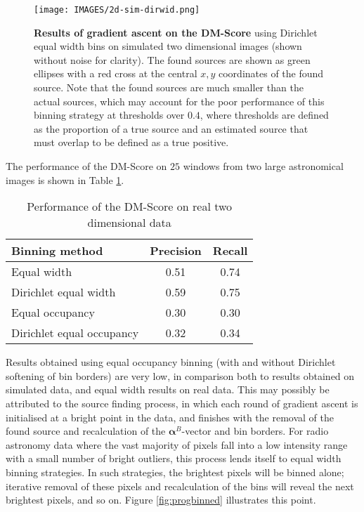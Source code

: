 \begin{figure}
\centering
\texttt{[image: IMAGES/2d-sim-dirwid.png]}
\caption[Gradient ascent on the DM-Score (2D)]{\textbf{Results of gradient ascent on the DM-Score} using Dirichlet equal width bins on simulated two dimensional images (shown without noise for clarity). The found sources are shown as green ellipses with a red cross at the central $x,y$ coordinates of the found source. Note that the found sources are much smaller than the actual sources, which may account for the poor performance of this binning strategy at thresholds over $0.4$, where thresholds are defined as the proportion of a true source and an estimated source that must overlap to be defined as a true positive. }
\label{fig:2d-sim-dirwid}
\end{figure}

The performance of the DM-Score on $25$ windows from two large astronomical images \cite{norris2006deep} is shown in Table \ref{table:2d-real-res}. 

\begin{table}
\centering
\caption[Performance of the DM-Score (real 2D)]{Performance of the DM-Score on real two dimensional data}
\begin{tabular}{l c c}
\hline
Binning method & Precision & Recall \\\hline
Equal width               & 0.51 & 0.74 \\
Dirichlet equal width     & 0.59 & 0.75 \\ 
Equal occupancy           & 0.30 & 0.30 \\
Dirichlet equal occupancy & 0.32 & 0.34 \\\hline
\end{tabular}
\label{table:2d-real-res}
\end{table}

Results obtained using equal occupancy binning (with and without Dirichlet softening of bin borders) are very low, in comparison both to results obtained on simulated data, and equal width results on real data. This may possibly be attributed to the source finding process, in which each round of gradient ascent is initialised at a bright point in the data, and finishes with the removal of the found source and recalculation of the $\boldsymbol{\alpha}^{B}$-vector and bin borders. For radio astronomy data where the vast majority of pixels fall into a low intensity range with a small number of bright outliers, this process lends itself to equal width binning strategies. In such strategies, the brightest pixels will be binned alone; iterative removal of these pixels and recalculation of the bins will reveal the next brightest pixels, and so on. Figure \ref{fig:progbinned} illustrates this point.

